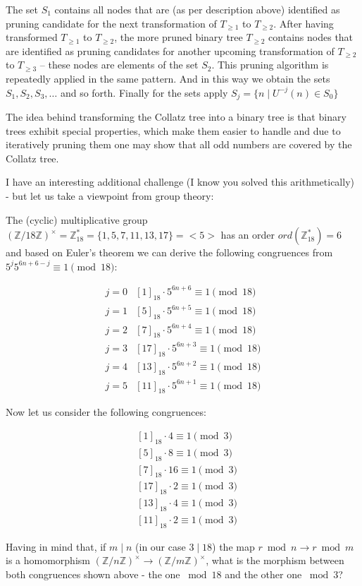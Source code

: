 The set $S_1$ contains all nodes that are (as per description above) identified as pruning candidate for the next transformation of $T_{\ge1}$ to $T_{\ge2}$. After having transformed $T_{\ge1}$ to $T_{\ge2}$, the more pruned binary tree $T_{\ge2}$ contains nodes that are identified as pruning candidates for another upcoming transformation of $T_{\ge2}$ to $T_{\ge3}$ -- these nodes are elements of the set $S_2$. This pruning algorithm is repeatedly applied in the same pattern. And in this way we obtain the sets $S_1,S_2,S_3,\ldots$ and so forth. Finally for the sets apply $S_j=\{n\mid U^{-j}(n)\in S_0\}$

The idea behind transforming the Collatz tree into a binary tree is that binary trees exhibit special properties, which make them easier to handle and due to iteratively pruning them one may show that all odd numbers are covered by the Collatz tree.

I have an interesting additional challenge (I know you solved this arithmetically) - but let us take a viewpoint from group theory:

The (cyclic) multiplicative group $(\mathbb{Z}/18\mathbb{Z})^\times=\mathbb{Z}^\ast_{18}=\{1,5,7,11,13,17\}=<5>$ has an order $ord(\mathbb{Z}^\ast_{18})=6$ and based on Euler's theorem we can derive the following congruences from $5^j5^{6n+6-j}\equiv1\pmod{18}$:

\[
\begin{array}{cc}
j=0 & [1]_{18}\cdot5^{6n+6}\equiv1\pmod{18}\\
j=1 & [5]_{18}\cdot5^{6n+5}\equiv1\pmod{18}\\
j=2 & [7]_{18}\cdot5^{6n+4}\equiv1\pmod{18}\\
j=3 & [17]_{18}\cdot5^{6n+3}\equiv1\pmod{18}\\
j=4 & [13]_{18}\cdot5^{6n+2}\equiv1\pmod{18}\\
j=5 & [11]_{18}\cdot5^{6n+1}\equiv1\pmod{18}
\end{array}
\]

Now let us consider the following congruences:

\[
\begin{array}{cc}
&[1]_{18}\cdot4\equiv1\pmod{3}\\
&[5]_{18}\cdot8\equiv1\pmod{3}\\
&[7]_{18}\cdot16\equiv1\pmod{3}\\
&[17]_{18}\cdot2\equiv1\pmod{3}\\
&[13]_{18}\cdot4\equiv1\pmod{3}\\
&[11]_{18}\cdot2\equiv1\pmod{3}
\end{array}
\]

Having in mind that, if $m\mid n$ (in our case $3\mid18$) the map $r\bmod n \rightarrow r\bmod m$ is a homomorphism $(\mathbb{Z}/n\mathbb{Z})^\times\rightarrow(\mathbb{Z}/m\mathbb{Z})^\times$, what is the morphism between both congruences shown above - the one $\bmod{18}$ and the other one $\bmod3$?


